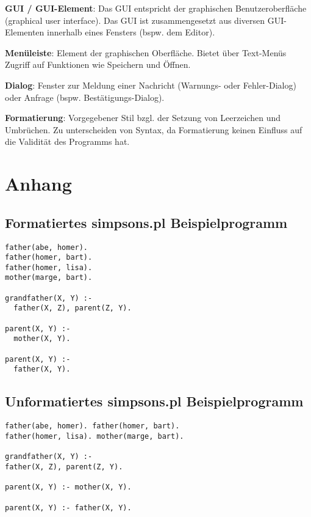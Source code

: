 \documentclass[parskip=full,11pt,twoside]{scrartcl}
\begin{document}
\textbf{GUI / GUI-Element}:
Das GUI entspricht der graphischen Benutzeroberfläche (graphical user interface). Das GUI ist zusammengesetzt aus diversen GUI-Elementen innerhalb eines Fensters (bspw. dem Editor).

\textbf{Menüleiste}:
Element der graphischen Oberfläche. Bietet über Text-Menüs Zugriff auf Funktionen wie Speichern und Öffnen.

\textbf{Dialog}:
Fenster zur Meldung einer Nachricht (Warnungs- oder Fehler-Dialog) oder Anfrage (bspw. Bestätigungs-Dialog).

\textbf{Formatierung}:
Vorgegebener Stil bzgl. der Setzung von Leerzeichen und Umbrüchen. Zu unterscheiden von Syntax, da Formatierung keinen Einfluss auf die Validität des Programms hat.

\newpage
\section{Anhang}

\subsection{Formatiertes simpsons.pl Beispielprogramm}

\begin{lstlisting}
father(abe, homer).
father(homer, bart).
father(homer, lisa).
mother(marge, bart).

grandfather(X, Y) :-
  father(X, Z), parent(Z, Y).

parent(X, Y) :-
  mother(X, Y).

parent(X, Y) :-
  father(X, Y).
\end{lstlisting}

\subsection{Unformatiertes simpsons.pl Beispielprogramm}

\begin{lstlisting}
father(abe, homer). father(homer, bart).
father(homer, lisa). mother(marge, bart).

grandfather(X, Y) :-
father(X, Z), parent(Z, Y).

parent(X, Y) :- mother(X, Y).

parent(X, Y) :- father(X, Y).
\end{lstlisting}
\end{document}
